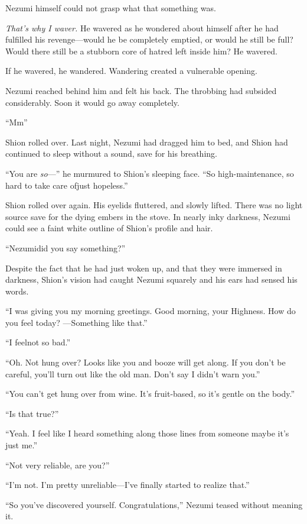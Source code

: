 Nezumi himself could not grasp what that something was.

\emph{That's why I waver.} He wavered as he wondered about himself after he had
fulfilled his revenge---would he be completely emptied, or would he still
be full? Would there still be a stubborn core of hatred left inside him?
He wavered.

If he wavered, he wandered. Wandering created a vulnerable opening.

Nezumi reached behind him and felt his back. The throbbing had subsided
considerably. Soon it would go away completely.

``Mm\el ''

Shion rolled over. Last night, Nezumi had dragged him to bed, and Shion
had continued to sleep without a sound, save for his breathing.

``You are \emph{so}---'' he murmured to Shion's sleeping face. ``So
high-main\-te\-nance, so hard to take care of\el just hopeless.''

Shion rolled over again. His eyelids fluttered, and slowly lifted. There
was no light source save for the dying embers in the stove. In nearly
inky darkness, Nezumi could see a faint white outline of Shion's profile
and hair.

``Nezumi\el did you say something?''

Despite the fact that he had just woken up, and that they were immersed
in darkness, Shion's vision had caught Nezumi squarely and his ears had
sensed his words.

``I was giving you my morning greetings. Good morning, your Highness.
How do you feel today? ---Something like that.''

``I feel\el not so bad.''

``Oh. Not hung over? Looks like you and booze will get along. If you
don't be careful, you'll turn out like the old man. Don't say I didn't
warn you.''

``You can't get hung over from wine. It's fruit-based, so it's gentle on
the body.''

``Is that true?''

``Yeah. I feel like I heard something along those lines from someone\el 
maybe it's just me.''

``Not very reliable, are you?''

``I'm not. I'm pretty unreliable---I've finally started to realize that.''

``So you've discovered yourself. Congratulations,'' Nezumi teased
without meaning it.

